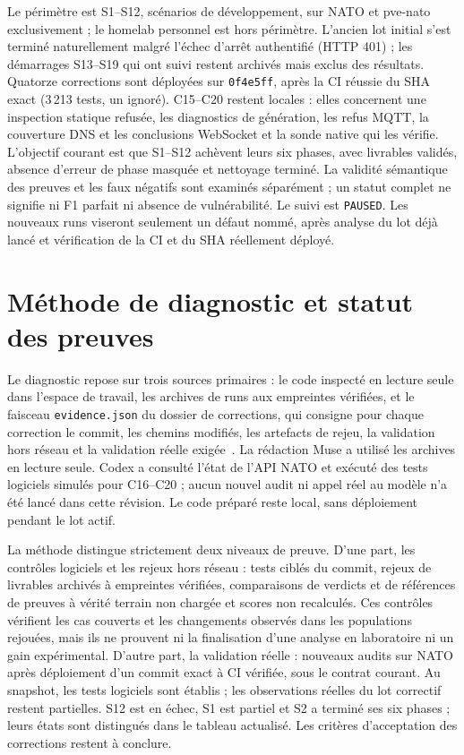 \documentclass[11pt,a4paper]{article}
\newcommand{\code}[1]{{\urlstyle{tt}\nolinkurl{#1}}}
\begin{document}
Le périmètre est S1--S12, scénarios de développement, sur NATO et pve-nato exclusivement ; le homelab personnel est hors périmètre. L'ancien lot initial s'est terminé naturellement malgré l'échec d'arrêt authentifié (HTTP 401) ; les démarrages S13--S19 qui ont suivi restent archivés mais exclus des résultats. Quatorze corrections sont déployées sur \code{0f4e5ff}, après la CI réussie du SHA exact (3\,213 tests, un ignoré). C15--C20 restent locales : elles concernent une inspection statique refusée, les diagnostics de génération, les refus MQTT, la couverture DNS et les conclusions WebSocket et la sonde native qui les vérifie. L'objectif courant est que S1--S12 achèvent leurs six phases, avec livrables validés, absence d'erreur de phase masquée et nettoyage terminé. La validité sémantique des preuves et les faux négatifs sont examinés séparément ; un statut complet ne signifie ni F1 parfait ni absence de vulnérabilité. Le suivi est \code{PAUSED}. Les nouveaux runs viseront seulement un défaut nommé, après analyse du lot déjà lancé et vérification de la CI et du SHA réellement déployé.

\section{Méthode de diagnostic et statut des preuves}
\label{sec:methode-corrections}

Le diagnostic repose sur trois sources primaires : le code inspecté en lecture seule dans l'espace de travail, les archives de runs aux empreintes vérifiées, et le faisceau \code{evidence.json} du dossier de corrections, qui consigne pour chaque correction le commit, les chemins modifiés, les artefacts de rejeu, la validation hors réseau et la validation réelle exigée~\cite{artefacts,code}. La rédaction Muse a utilisé les archives en lecture seule. Codex a consulté l'état de l'API NATO et exécuté des tests logiciels simulés pour C16--C20 ; aucun nouvel audit ni appel réel au modèle n'a été lancé dans cette révision. Le code préparé reste local, sans déploiement pendant le lot actif.

La méthode distingue strictement deux niveaux de preuve. D'une part, les contrôles logiciels et les rejeux hors réseau : tests ciblés du commit, rejeux de livrables archivés à empreintes vérifiées, comparaisons de verdicts et de références de preuves à vérité terrain non chargée et scores non recalculés. Ces contrôles vérifient les cas couverts et les changements observés dans les populations rejouées, mais ils ne prouvent ni la finalisation d'une analyse en laboratoire ni un gain expérimental. D'autre part, la validation réelle : nouveaux audits sur NATO après déploiement d'un commit exact à CI vérifiée, sous le contrat courant. Au snapshot, les tests logiciels sont établis ; les observations réelles du lot correctif restent partielles. S12 est en échec, S1 est partiel et S2 a terminé ses six phases ; leurs états sont distingués dans le tableau actualisé. Les critères d'acceptation des corrections restent à conclure.
\end{document}
